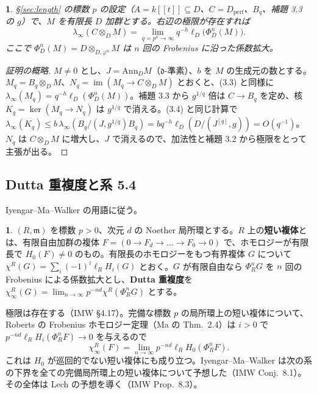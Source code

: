 \documentclass[11pt,a4paper]{ltjsarticle}
\newcommand{\stmtname}{}
\theoremstyle{plain}
\newtheorem*{stmtgen}{\stmtname}
\newenvironment{stmt}[1]{\renewcommand{\stmtname}{#1}\begin{stmtgen}}{\end{stmtgen}}
\theoremstyle{definition}
\newtheorem*{dstmtgen}{\stmtname}
\newenvironment{dstmt}[1]{\renewcommand{\stmtname}{#1}\begin{dstmtgen}}{\end{dstmtgen}}
\newcommand{\m}{\mathfrak{m}}
\newcommand{\dd}{\mathfrak{d}}
\newcommand{\im}{\operatorname{im}}
\newcommand{\perf}{\mathrm{perf}}
\begin{document}
\begin{stmt}{補題 3.4}
\S\ref{sec:length} の標数 $p$ の設定（$A = k[[t]]\subseteq D$、$C = D_\perf$、$B_q$、補題 3.3 の $g$）で、$M$ を有限長 $D$ 加群とする。右辺の極限が存在すれば
\[
  \lambda_\infty(C\otimes_DM) = \lim_{q = p^n\to\infty}q^{-h}\ell_D\bigl(\Phi^n_D(M)\bigr).
\]
ここで $\Phi^n_D(M) = D\otimes_{D,\varphi^n}M$ は $n$ 回の Frobenius に沿った係数拡大。
\end{stmt}
\begin{proof}[証明の概略]
$M\ne0$ とし、$J = \mathrm{Ann}_DM$（$\dd$-準素）、$b$ を $M$ の生成元の数とする。$M_q = B_q\otimes_DM$、$N_q = \im(M_q\to C\otimes_DM)$ とおくと、(3.3) と同様に $\lambda_\infty(M_q) = q^{-h}\ell_D(\Phi^n_D(M))$。補題 3.3 から $g^{1/q}$ 倍は $C\to B_q$ を定め、核 $K_q = \ker(M_q\to N_q)$ は $g^{1/q}$ で消える。(3.4) と同じ計算で
$\lambda_\infty(K_q)\le b\,\lambda_\infty(B_q/(J,g^{1/q})B_q) = bq^{-h}\ell_D(D/(J^{[q]},g)) = O(q^{-1})$。
$N_q$ は $C\otimes_DM$ に増大し、$J$ で消えるので、加法性と補題 3.2 から極限をとって主張が出る。
\end{proof}


\subsection{Dutta 重複度と系 5.4}
Iyengar--Ma--Walker の用語に従う。

\begin{dstmt}{定義 5.3}
$(R,\m)$ を標数 $p>0$、次元 $d$ の Noether 局所環とする。$R$ 上の\textbf{短い複体}とは、有限自由加群の複体 $F = (0\to F_d\to\dots\to F_0\to0)$ で、ホモロジーが有限長で $H_0(F)\ne0$ のもの。有限長のホモロジーをもつ有界複体 $G$ について $\chi^R(G) = \sum_i(-1)^i\ell_RH_i(G)$ とおく。$G$ が有限自由なら $\Phi^n_RG$ を $n$ 回の Frobenius による係数拡大とし、\textbf{Dutta 重複度}を $\chi^R_\infty(G) = \lim_{n\to\infty}p^{-nd}\chi^R(\Phi^n_RG)$ とする。
\end{dstmt}
極限は存在する（IMW \S4.17）。完備な標数 $p$ の局所環上の短い複体について、Roberts の Frobenius ホモロジー定理（Ma の Thm.~2.4）は $i>0$ で $p^{-nd}\ell_RH_i(\Phi^n_RF)\to0$ を与えるので
\begin{equation}\tag{5.1}
  \chi^R_\infty(F) = \lim_{n\to\infty}p^{-nd}\ell_RH_0(\Phi^n_RF).
\end{equation}
これは $H_0$ が巡回的でない短い複体にも成り立つ。Iyengar--Ma--Walker は次の系の下界を全ての完備局所環上の短い複体について予想した（IMW Conj.~8.1）。その全体は Lech の予想を導く（IMW Prop.~8.3）。
\end{document}
